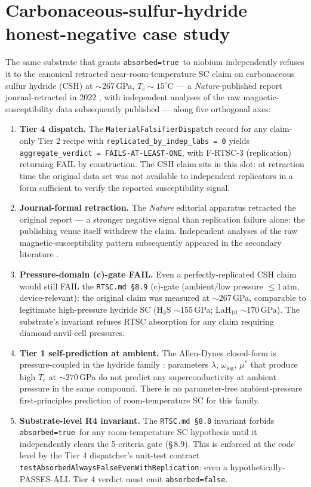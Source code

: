 \documentclass[11pt,a4paper]{article}
\newcommand{\absorbedtrue}{\textcolor{honestgreen}{\texttt{absorbed=true}}}
\newcommand{\absorbedfalse}{\textcolor{honestred}{\texttt{absorbed=false}}}
\begin{document}
\section{Carbonaceous-sulfur-hydride honest-negative case study}
\label{sec:rtsc-neg}

The same substrate that grants \absorbedtrue\ to niobium independently
refuses it to the canonical retracted near-room-temperature SC claim
on carbonaceous sulfur hydride (CSH) at $\sim 267$\,GPa, $T_c \sim
15^{\circ}$C \cite{snider2020csh} --- a \emph{Nature}-published report
journal-retracted in 2022 \cite{snider2022retraction}, with independent
analyses of the raw magnetic-susceptibility data subsequently published
\cite{hirsch2022csh} --- along five orthogonal axes:

\begin{enumerate}\itemsep0.4em
\item \textbf{Tier 4 dispatch.} The
  \texttt{MaterialFalsifierDispatch} record for any claim-only Tier 2
  recipe with \texttt{replicated\_by\_indep\_labs = 0} yields
  \texttt{aggregate\_verdict = FAILS-AT-LEAST-ONE}, with F-RTSC-3
  (replication) returning FAIL by construction. The CSH claim sits in
  this slot: at retraction time the original data set was not
  available to independent replicators in a form sufficient to verify
  the reported susceptibility signal.
\item \textbf{Journal-formal retraction.} The \emph{Nature} editorial
  apparatus retracted the original report
  \cite{snider2022retraction} --- a stronger negative signal than
  replication failure alone: the publishing venue itself withdrew the
  claim. Independent analyses of the raw magnetic-susceptibility
  pattern subsequently appeared in the secondary literature
  \cite{hirsch2022csh}.
\item \textbf{Pressure-domain (c)-gate FAIL.}
  Even a perfectly-replicated CSH claim would still FAIL the
  \texttt{RTSC.md \S 8.9} (c)-gate (ambient/low pressure $\le 1$\,atm,
  device-relevant): the original claim was measured at $\sim 267$\,GPa,
  comparable to legitimate high-pressure hydride SC
  (H$_3$S $\sim 155$\,GPa; LaH$_{10}$ $\sim 170$\,GPa). The
  substrate's invariant refuses RTSC absorption for any claim
  requiring diamond-anvil-cell pressures.
\item \textbf{Tier 1 self-prediction at ambient.} The Allen-Dynes
  closed-form is pressure-coupled in the hydride family
  \cite{allen1975}: parameters $\lambda$, $\omega_{\log}$, $\mu^*$
  that produce high $T_c$ at $\sim 270$\,GPa do not predict any
  superconductivity at ambient pressure in the same compound. There
  is no parameter-free ambient-pressure first-principles prediction
  of room-temperature SC for this family.
\item \textbf{Substrate-level R4 invariant.} The \texttt{RTSC.md \S 8.8}
  invariant forbids \absorbedtrue\ for any room-temperature SC
  hypothesis until it independently clears the 5-criteria gate
  (\S\,8.9). This is enforced at the code level by the Tier 4
  dispatcher's unit-test contract
  \texttt{testAbsorbedAlwaysFalseEvenWithReplication}: even a
  hypothetically-PASSES-ALL Tier 4 verdict must emit \absorbedfalse.
\end{enumerate}
\end{document}
